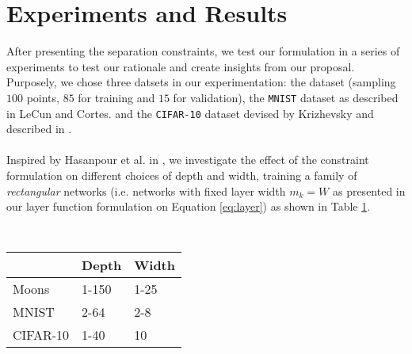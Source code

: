 \section{Experiments and Results}\label{sec:experiments}
After presenting the separation constraints, we test our formulation in a series of experiments to test our rationale and create insights from our proposal. Purposely, we chose three datsets in our experimentation: the \moons dataset (sampling $100$ points, $85$ for training and $15$ for validation), the \texttt{MNIST} dataset as described in LeCun and Cortes. \cite{mnist} and the \texttt{CIFAR-10} dataset devised by Krizhevsky and described in \cite{cifar10}.
\\\\
Inspired by Hasanpour et al. in \cite{simpnet}, we investigate the effect of the constraint formulation on different choices of depth and width, training a family of \emph{rectangular} networks (i.e. networks with fixed layer width $m_k=W$ as presented in our layer function formulation on Equation \ref{eq:layer}) as shown in Table \ref{tab:grids}.
\\\\

\begin{table}[]
\centering
\begin{tabular}{@{}lll@{}}
\toprule
         & Depth & Width \\ \midrule
Moons    & 1-150 & 1-25  \\
MNIST    & 2-64  & 2-8   \\
CIFAR-10 & 1-40  & 10    \\ \bottomrule
\end{tabular}
\caption{}\label{tab:grids}
\end{table}

